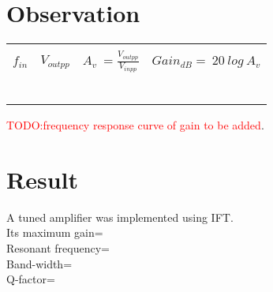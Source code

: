 \section*{Observation}
\begin{center}

\begin{tabular}{|l|l|l|l|}

\hline
 & & &\\
 
$f_{in}$  &  $V_{outpp}$ & $A_v\ =\frac{V_{outpp}}{V_{inpp}} $ & $Gain_{dB}=\ 20\ log\ A_v$ \\
 & & & \\ \hline
 & & &\\ \hline
& & &\\ \hline
& & &\\ \hline
& & &\\ \hline
& & &\\ \hline

\end{tabular}
\end{center}
\textcolor{red}{TODO:frequency response curve of gain to be added}. 
\section*{Result}
A tuned amplifier was implemented using IFT.\\
Its maximum gain= \\
Resonant frequency= \\
Band-width=\\
Q-factor= 
